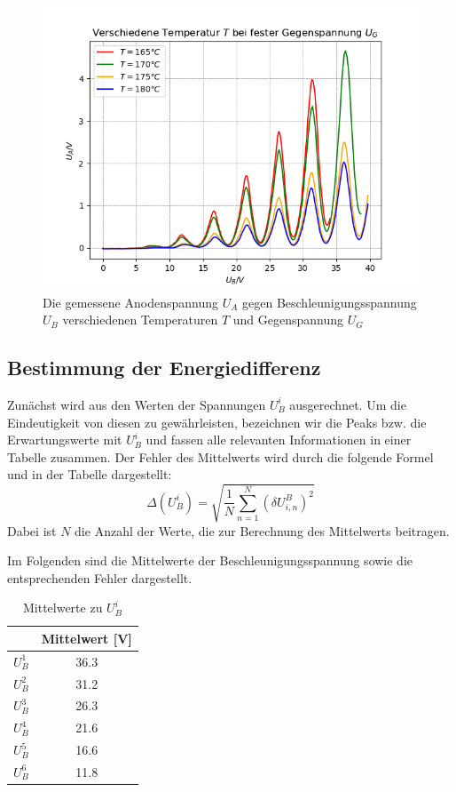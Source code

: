 \documentclass{article}
\begin{document}
\begin{multicols}{2}
\begin{figure}[H]
  \centering
  \includegraphics[scale=0.55]{FH_vieleU.png}
  \caption{Die gemessene Anodenspannung $U_A$ gegen Beschleunigungsspannung $U_B$
  verschiedenen Temperaturen $T$ und Gegenspannung $U_G$}
\end{figure}

\subsection*{Bestimmung der Energiedifferenz}
Zunächst wird aus den Werten der Spannungen $U_B^i$ ausgerechnet. Um die Eindeutigkeit von diesen 
zu gewährleisten, bezeichnen wir die Peaks bzw. die Erwartungswerte mit $U^i_B$ und 
fassen alle relevanten Informationen in einer Tabelle zusammen.
Der Fehler des Mittelwerts wird durch die folgende Formel und in der Tabelle dargestellt:
\begin{equation*}
\Delta(U^i_B) = \sqrt{\frac{1}{N} \sum_{n=1}^{N} \left( \delta U_{i,n}^B \right)^2}
\end{equation*}
Dabei ist \( N \) die Anzahl der Werte, die zur Berechnung des Mittelwerts beitragen.

Im Folgenden sind die Mittelwerte der Beschleunigungsspannung sowie die entsprechenden Fehler dargestellt.
\begin{table}[H]
  \centering
  \begin{tabular}{cc} 
      \hline
      & Mittelwert [V] \\ \hline
      $U^1_B$ & 36.3 \\ \hline
      $U^2_B$ & 31.2 \\ \hline
      $U^3_B$ & 26.3 \\ \hline
      $U^4_B$ & 21.6 \\ \hline
      $U^5_B$ & 16.6 \\ \hline
      $U^6_B$ & 11.8 \\ \hline
  \end{tabular}
  \caption{Mittelwerte zu $U^i_B$}
  \label{tab:median_values}
\end{table}


\end{multicols}
\end{document}
